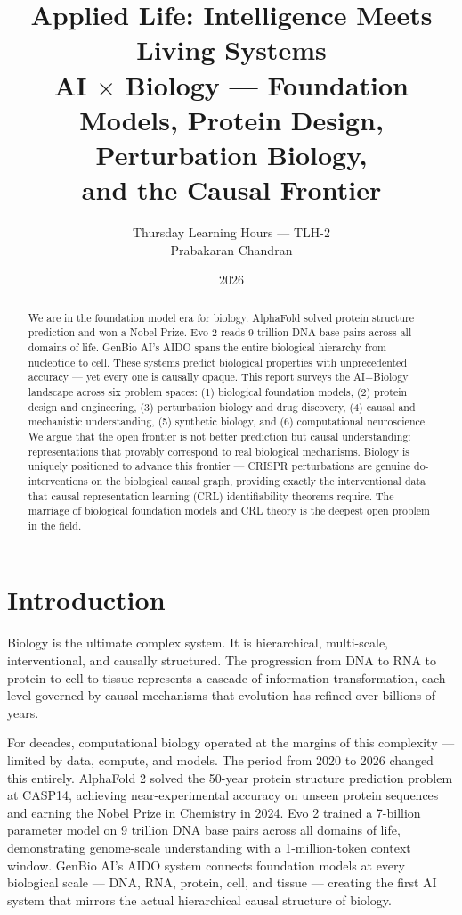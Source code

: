 \documentclass[11pt]{article}
\title{\textbf{Applied Life: Intelligence Meets Living Systems}\\
{\large AI $\times$ Biology --- Foundation Models, Protein Design, Perturbation Biology,\\and the Causal Frontier}}
\author{Thursday Learning Hours --- TLH-2\\Prabakaran Chandran}
\date{2026}
\begin{document}
\maketitle
\begin{abstract}
We are in the foundation model era for biology. AlphaFold solved protein structure prediction and won a Nobel Prize. Evo 2 reads 9 trillion DNA base pairs across all domains of life. GenBio AI's AIDO spans the entire biological hierarchy from nucleotide to cell. These systems predict biological properties with unprecedented accuracy --- yet every one is causally opaque. This report surveys the AI+Biology landscape across six problem spaces: (1) biological foundation models, (2) protein design and engineering, (3) perturbation biology and drug discovery, (4) causal and mechanistic understanding, (5) synthetic biology, and (6) computational neuroscience. We argue that the open frontier is not better prediction but causal understanding: representations that provably correspond to real biological mechanisms. Biology is uniquely positioned to advance this frontier --- CRISPR perturbations are genuine do-interventions on the biological causal graph, providing exactly the interventional data that causal representation learning (CRL) identifiability theorems require. The marriage of biological foundation models and CRL theory is the deepest open problem in the field.
\end{abstract}

\tableofcontents
\newpage

\section{Introduction}

Biology is the ultimate complex system. It is hierarchical, multi-scale, interventional, and causally structured. The progression from DNA to RNA to protein to cell to tissue represents a cascade of information transformation, each level governed by causal mechanisms that evolution has refined over billions of years.

For decades, computational biology operated at the margins of this complexity --- limited by data, compute, and models. The period from 2020 to 2026 changed this entirely. AlphaFold 2 \citep{jumper2021highly} solved the 50-year protein structure prediction problem at CASP14, achieving near-experimental accuracy on unseen protein sequences and earning the Nobel Prize in Chemistry in 2024. Evo 2 \citep{nguyen2024evo2} trained a 7-billion parameter model on 9 trillion DNA base pairs across all domains of life, demonstrating genome-scale understanding with a 1-million-token context window. GenBio AI's AIDO system \citep{xing2025aido} connects foundation models at every biological scale --- DNA, RNA, protein, cell, and tissue --- creating the first AI system that mirrors the actual hierarchical causal structure of biology.
\end{document}
